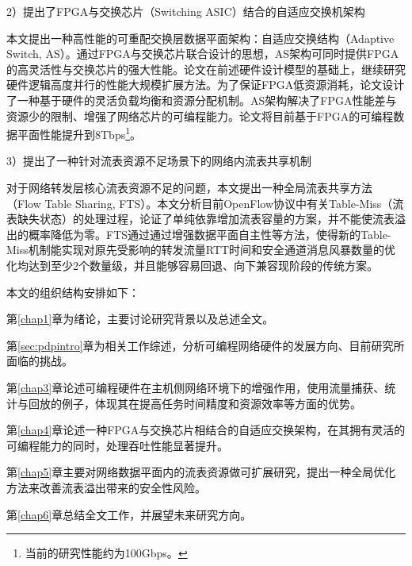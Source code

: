 2）提出了FPGA与交换芯片（Switching ASIC）结合的自适应交换机架构

本文提出一种高性能的可重配交换层数据平面架构：自适应交换结构（Adaptive Switch, AS）。通过FPGA与交换芯片联合设计的思想，AS架构可同时提供FPGA的高灵活性与交换芯片的强大性能。论文在前述硬件设计模型的基础上，继续研究硬件逻辑高度并行的性能大规模扩展方法。为了保证FPGA低资源消耗，论文设计了一种基于硬件的灵活负载均衡和资源分配机制。AS架构解决了FPGA性能差与资源少的限制、增强了网络芯片的可编程能力。论文将目前基于FPGA的可编程数据平面性能提升到8Tbps\footnote{当前的研究性能约为100Gbps。}。



3）提出了一种针对流表资源不足场景下的网络内流表共享机制

对于网络转发层核心流表资源不足的问题，本文提出一种全局流表共享方法（Flow Table Sharing, FTS）。本文分析目前OpenFlow协议中有关Table-Miss（流表缺失状态）的处理过程，论证了单纯依靠增加流表容量的方案，并不能使流表溢出的概率降低为零。FTS通过通过增强数据平面自主性等方法，使得新的Table-Miss机制能实现对原先受影响的转发流量RTT时间和安全通道消息风暴数量的优化均达到至少2个数量级，并且能够容易回退、向下兼容现阶段的传统方案。


\label{chap15}

本文的组织结构安排如下：

第\ref{chap1}章为绪论，主要讨论研究背景以及总述全文。

第\ref{sec:pdpintro}章为相关工作综述，分析可编程网络硬件的发展方向、目前研究所面临的挑战。

第\ref{chap3}章论述可编程硬件在主机侧网络环境下的增强作用，使用流量捕获、统计与回放的例子，体现其在提高任务时间精度和资源效率等方面的优势。

第\ref{chap4}章论述一种FPGA与交换芯片相结合的自适应交换架构，在其拥有灵活的可编程能力的同时，处理吞吐性能显著提升。

第\ref{chap5}章主要对网络数据平面内的流表资源做可扩展研究，提出一种全局优化方法来改善流表溢出带来的安全性风险。

第\ref{chap6}章总结全文工作，并展望未来研究方向。








































